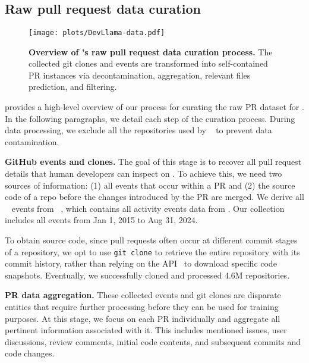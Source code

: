 \section{\tech{}}
\label{section:approach}


\subsection{Raw pull request data curation}
\label{subsec:raw-data}

\begin{figure}[htbp]
    \centering
    \texttt{[image: plots/DevLlama-data.pdf]}
    \caption{\textbf{Overview of \tech's raw pull request data curation process.}
The collected git clones and \github events are transformed into self-contained PR instances via decontamination, aggregation, relevant files prediction, and filtering.}
    \label{fig:data}
\end{figure}

 provides a high-level overview of our process for curating the raw PR dataset for \ours.
In the following paragraphs, we detail each step of the curation process.
During data processing, we exclude all the repositories used by \swebench{}~\cite{swebench} to prevent data contamination.


\textbf{GitHub events and clones.}
The goal of this stage is to recover all pull request details that human developers can inspect on \github. To achieve this, we need two sources of information: (1) all events that occur within a PR and (2) the source code of a repo before the changes introduced by the PR are merged.
We derive all \github~\cite{github} events from \gharchive~\cite{gharchive}, which contains all activity events data from \github. Our collection includes all \github events from Jan 1, 2015 to Aug 31, 2024.

To obtain source code, since pull requests often occur at different commit stages of a repository, we opt to use \texttt{git clone} to retrieve the entire repository with its commit history, rather than relying on the \github API~\cite{ghapi} to download specific code snapshots.
Eventually, we successfully cloned and processed 4.6M repositories.

\textbf{PR data aggregation.}
These collected events and git clones are disparate entities that require further processing before they can be used for training purposes.
At this stage, we focus on each PR individually and aggregate all pertinent information associated with it. This includes mentioned issues, user discussions, review comments, initial code contents, and subsequent commits and code changes.

